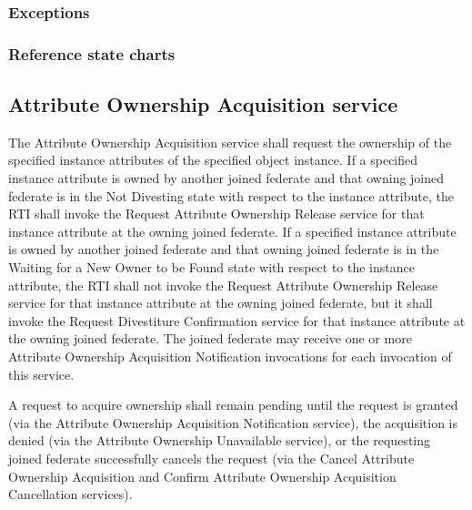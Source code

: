 \begin{compactstdpage}


    \subsubsection{Exceptions}



    \subsubsection{Reference state charts}



    \subsection{Attribute Ownership Acquisition service}


    The Attribute Ownership Acquisition service shall request the ownership of the specified instance attributes of the specified object instance. If a specified instance attribute is owned by another joined federate and that owning joined federate is in the Not Divesting state with respect to the instance attribute, the RTI shall invoke the Request Attribute Ownership Release \rtiinitiated{} service for that instance attribute at the owning joined federate. If a specified instance attribute is owned by another joined federate and that owning joined federate is in the Waiting for a New Owner to be Found state with respect to the instance attribute, the RTI shall not invoke the Request Attribute Ownership Release \rtiinitiated{} service for that instance attribute at the owning joined federate, but it shall invoke the Request Divestiture Confirmation \rtiinitiated{} service for that instance attribute at the owning joined federate. The joined federate may receive one or more Attribute Ownership Acquisition Notification \rtiinitiated{} invocations for each invocation of this service.


    A request to acquire ownership shall remain pending until the request is granted (via the Attribute Ownership Acquisition Notification \rtiinitiated{} service), the acquisition is denied (via the Attribute Ownership Unavailable \rtiinitiated{} service), or the requesting joined federate successfully cancels the request (via the Cancel Attribute Ownership Acquisition and Confirm Attribute Ownership Acquisition Cancellation \rtiinitiated{} services).



\end{compactstdpage}
